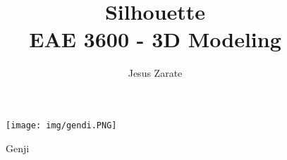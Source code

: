 \documentclass[a4paper]{article}
\title{
  Silhouette\\
  \large EAE 3600 - 3D Modeling}
\author{Jesus Zarate}
\begin{document}
\maketitle

\begin{figure}[h]
\centering
\texttt{[image: img/gendi.PNG]}
\caption{Genji}
\label{fig:Gengi}
\end{figure}
\end{document}
